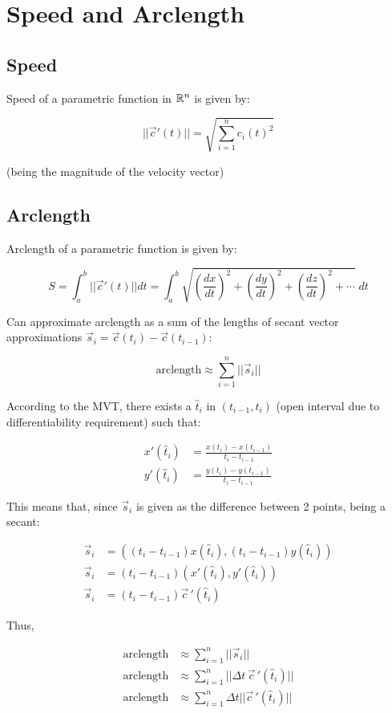 \section{Speed and Arclength}

\subsection{Speed}

Speed of a parametric function in $\mathbb{R}^n$ is given by:

$$||\vec{c}'(t)||=\sqrt{\displaystyle\sum_{i=1}^{n}c_i(t)^2}$$

(being the magnitude of the velocity vector)

\subsection{Arclength}

Arclength of a parametric function is given by:

\[S=\int_a^b ||\vec{c}'(t)||dt=\int_a^b\sqrt{(\frac{dx}{dt})^2+(\frac{dy}{dt})^2+(\frac{dz}{dt})^2+\cdots}\;dt\]

Can approximate arclength as a sum of the lengths of secant vector approximations
$\vec{s}_i=\vec{c}(t_i)-\vec{c}(t_{i-1})$:

\[\mbox{arclength}\approx\sum_{i=1}^n||\vec{s}_i||\]

According to the MVT, there exists a $\hat{t}_i$ in $(t_{i-1},t_i)$ (open interval due to differentiability requirement) such that:

\begin{align*}
    x'(\hat{t}_i)&=\frac{x(t_i)-x(t_{i-1})}{t_i-t_{i-1}}\\
    y'(\hat{t}_i)&=\frac{y(t_i)-y(t_{i-1})}{t_i-t_{i-1}}
\end{align*}

This means that, since $\vec{s}_i$ is given as the difference between 2 points,
being a secant:

\begin{align*}
    \vec{s}_i&=\left((t_i-t_{i-1})x(\hat{t}_i), (t_i-t_{i-1})y(\hat{t}_i)\right )\\
    \vec{s}_i&=(t_i-t_{i-1})\left(x'(\hat{t}_i),y'(\hat{t}_i)\right)\\
    \vec{s}_i&=(t_i-t_{i-1})\vec{c}\,'(\hat{t}_i)
\end{align*}

Thus,

\begin{align*}
    \mbox{arclength}&\approx\sum_{i=1}^n||\vec{s}_i||\\
    \mbox{arclength}&\approx\sum_{i=1}^n||\Delta t \,\vec{c}\,'(\hat{t}_i)||\\
    \mbox{arclength}&\approx\sum_{i=1}^n\Delta t||\vec{c}\,'(\hat{t}_i)||
\end{align*}


